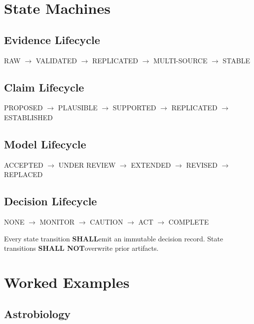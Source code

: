 \documentclass[11pt,a4paper]{article}
\newcommand{\shall}{\textbf{SHALL}}
\newcommand{\shallnot}{\textbf{SHALL NOT}}
\begin{document}
\section{State Machines}

\subsection{Evidence Lifecycle}

\begin{center}
RAW $\rightarrow$ VALIDATED $\rightarrow$ REPLICATED $\rightarrow$ MULTI-SOURCE $\rightarrow$ STABLE
\end{center}

\subsection{Claim Lifecycle}

\begin{center}
PROPOSED $\rightarrow$ PLAUSIBLE $\rightarrow$ SUPPORTED $\rightarrow$ REPLICATED $\rightarrow$ ESTABLISHED
\end{center}

\subsection{Model Lifecycle}

\begin{center}
ACCEPTED $\rightarrow$ UNDER REVIEW $\rightarrow$ EXTENDED $\rightarrow$ REVISED $\rightarrow$ REPLACED
\end{center}

\subsection{Decision Lifecycle}

\begin{center}
NONE $\rightarrow$ MONITOR $\rightarrow$ CAUTION $\rightarrow$ ACT $\rightarrow$ COMPLETE
\end{center}

Every state transition \shall emit an immutable decision record. State transitions \shallnot overwrite prior artifacts.

\section{Worked Examples}

\subsection{Astrobiology}
\end{document}
